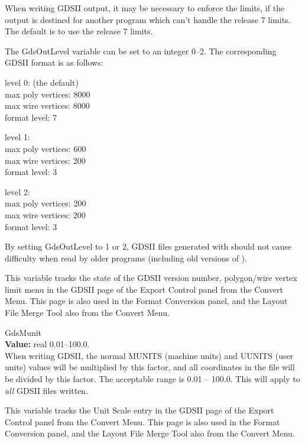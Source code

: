 \begin{description}
When writing GDSII output, it may be necessary to enforce the limits,
if the output is destined for another program which can't handle the
release 7 limits.  The {\Xic} default is to use the release 7 limits.

The {\et GdsOutLevel} variable can be set to an integer 0--2.  The
corresponding GDSII format is as follows:
\begin{description}
\item{level 0: (the default)}\\
max poly vertices: 8000\\
max wire vertices: 8000\\
format level: 7
\item{level 1:}\\
max poly vertices: 600\\
max wire vertices: 200\\
format level: 3
\item{level 2:}\\
max poly vertices: 200\\
max wire vertices: 200\\
format level: 3
\end{description}

By setting {\et GdsOutLevel} to 1 or 2, GDSII files generated with
{\Xic} should not cause difficulty when read by older programs
(including old versions of {\Xic}).

This variable tracks the state of the {\cb GDSII version number,
polygon/wire vertex limit} menu in the {\cb GDSII} page of the {\cb
Export Control} panel from the {\cb Convert Menu}.  This page is also
used in the {\cb Format Conversion} panel, and the {\cb Layout File
Merge Tool} also from the {\cb Convert Menu}.

\item{\et GdsMunit}\\
{\bf Value:} real 0.01--100.0.\\
When writing GDSII, the normal MUNITS (machine units) and UUNITS (user
units) values will be multiplied by this factor, and all coordinates
in the file will be divided by this factor.  The acceptable range is
0.01 -- 100.0.  This will apply to {\it all} GDSII files written. 

This variable tracks the {\cb Unit Scale} entry in the {\cb GDSII}
page of the {\cb Export Control} panel from the {\cb Convert Menu}. 
This page is also used in the {\cb Format Conversion} panel, and the
{\cb Layout File Merge Tool} also from the {\cb Convert Menu}.


\end{description}
